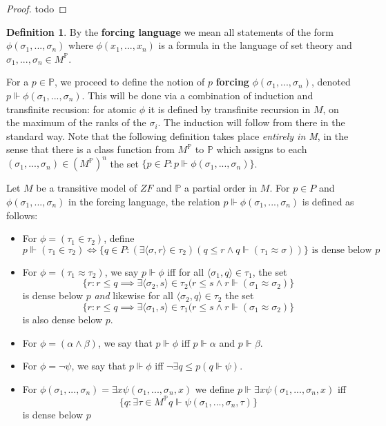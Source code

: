 \documentclass{article}
\theoremstyle{definition}
\newtheorem{definition}{Definition}[section]
\theoremstyle{plain}
\theoremstyle{theorem}
\begin{document}
	\begin{proof}
	todo
\end{proof}
\begin{definition}
	By the \textbf{forcing language} we mean all statements of the form $\phi(\sigma_1,...,\sigma_n)$ where $\phi(x_1,...,x_n)$ is a formula in the language of set theory and $\sigma_1,...,\sigma_n \in M^{\mathbb{P}}$. \par 
	For a $p \in \mathbb{P}$, we proceed to define the notion of $p$ \textbf{forcing} $\phi(\sigma_1,...,\sigma_n)$, denoted $p \Vdash \phi(\sigma_1,...,\sigma_n)$. This will be done via a combination of induction and transfinite recusion: for atomic $\phi$ it is defined by transfinite recursion in $M$, on the maximum of the ranks of the $\sigma_i$. The induction will follow from there in the standard way. Note that the following definition takes place \textit{entirely in M}, in the sense that there is a class function from $M^{\mathbb{P}}$ to $\mathbb{P}$ which assigns to each $(\sigma_1,...,\sigma_n) \in (M^{\mathbb{P}})^n$ the set $\{p \in P: p \Vdash \phi(\sigma_1,...,\sigma_n)\}$.  
	\par Let $M$ be a transitive model of $ZF$ and $\mathbb{P}$ a partial order in $M$. For $p\in P$ and $\phi(\sigma_1,...,\sigma_n)$ in the forcing language, the relation $p \Vdash \phi(\sigma_1,...,\sigma_n)$ is defined as follows:
	\begin{itemize}
		\item For $\phi = (\tau_1 \in \tau_2)$, define 
		\[ p \Vdash (\tau_1 \in \tau_2) \iff \{q \in P:(\exists \langle\sigma,r\rangle \in \tau_2)(q \leq r \wedge q \Vdash (\tau_1 \approx \sigma)) \} \textrm{ is dense below }p \]
		\item For $\phi = (\tau_1 \approx \tau_2)$, we say $p \Vdash \phi$ iff for all $\langle \sigma_1,q \rangle \in \tau_1$, the set
		\[ \{r: r \leq q \implies \exists \langle \sigma_2,s \rangle \in \tau_2(r \leq s \wedge r \Vdash (\sigma_1 \approx \sigma_2)   \} \]
		is dense below $p$ \textit{and} likewise for all $\langle \sigma_2,q \rangle \in \tau_2$ the set
		\[ \{r: r \leq q \implies \exists \langle \sigma_1,s \rangle \in \tau_1 (r \leq s \wedge r \Vdash (\sigma_1 \approx \sigma_2) \} \]
		is also dense below $p$.
		\item For $\phi = (\alpha \wedge \beta)$, we say that $p \Vdash \phi$ iff $p \Vdash \alpha$ and $p \Vdash \beta$. 
		\item For $\phi = \neg \psi$, we say that $p \Vdash \phi$ iff $\neg \exists q \leq p (q \Vdash \psi)$. 
		\item For $\phi(\sigma_1,...,\sigma_n) = \exists x \psi(\sigma_1,...,\sigma_n,x)$ we define $p \Vdash \exists x \psi (\sigma_1,...,\sigma_n,x)$ iff 
		\[ \{ q: \exists \tau \in M^{\mathbb{P}} q \Vdash \psi(\sigma_1,...,\sigma_n,\tau)\} \] is dense below $p$ 
	\end{itemize}
\end{definition}
\end{document}
